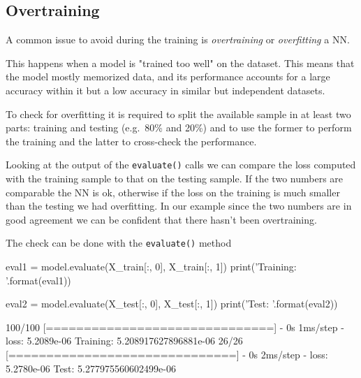 \subsection{Overtraining}
\label{sec:overtraining}
A common issue to avoid during the training is \emph{overtraining} or \emph{overfitting} a NN. 

This happens when a model is "trained too well" on the dataset. This means that the model mostly memorized data, and its performance accounts for a large accuracy within it but a low accuracy in similar but independent datasets. 

To check for overfitting it is required to split the available sample in at least two parts: training and testing (e.g.~80\% and 20\%) and to use the former to perform the training and the latter to cross-check the performance.


Looking at the output of the \texttt{evaluate()} calls we can compare the loss computed with the training sample to that on the testing sample. If the two numbers are comparable the NN is ok, otherwise if the loss on the training is much smaller than the testing we had overfitting.
In our example since the two numbers are in good agreement we can be confident that there hasn't been overtraining.

The check can be done with the \texttt{evaluate()} method

\begin{ipython}
eval1 = model.evaluate(X_train[:, 0], X_train[:, 1])
print('Training: {}'.format(eval1))

eval2 = model.evaluate(X_test[:, 0], X_test[:, 1])
print('Test: {}'.format(eval2))
\end{ipython}
\begin{ioutput}
100/100 [==============================] - 0s 1ms/step - loss: 5.2089e-06
Training: 5.208917627896881e-06
26/26 [==============================] - 0s 2ms/step - loss: 5.2780e-06
Test: 5.277975560602499e-06
\end{ioutput}

